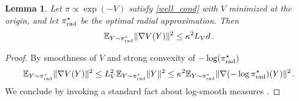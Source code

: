 \documentclass[twoside]{article}
\newcommand{\1}{\mathds{1}}
\newcommand*{\E}{\mathbb E}
\newcommand{\pirad}{\pi_{\rm rad}}
\theoremstyle{plain}
\newtheorem{lemma}[theorem]{Lemma}
\theoremstyle{definition}
\theoremstyle{remark}
\begin{document}
\begin{lemma}\label{lem:sgd_lemma1}
Let $\pi\propto \exp(-V)$ satisfy \ref{well_cond} with $V$ minimized at the origin, and let $\pirad^\star$ be the optimal radial approximation. Then  
\begin{align*}
    \E_{Y \sim \pi^\star_{\rm rad}}\|\nabla V(Y)\|^2 \leq \kappa^2 L_V d\,.
\end{align*}
\end{lemma}
\begin{proof}
    By smoothness of $V$ and strong convexity of $-\log(\pirad^\star)$
    \begin{align*}
        \E_{Y \sim \pi^\star_{\rm rad}}\|\nabla V(Y)\|^2 \leq L_V^2 \E_{Y \sim \pi^\star_{\rm rad}}\|Y\|^2 \leq \kappa^2 \E_{Y \sim \pirad^\star}\|\nabla(-\log\pirad^\star)(Y)\|^2\,.
    \end{align*}
We conclude by invoking a standard fact about log-smooth measures \citep[``basic lemma'']{ChewiBook}. 
\end{proof}
\end{document}
